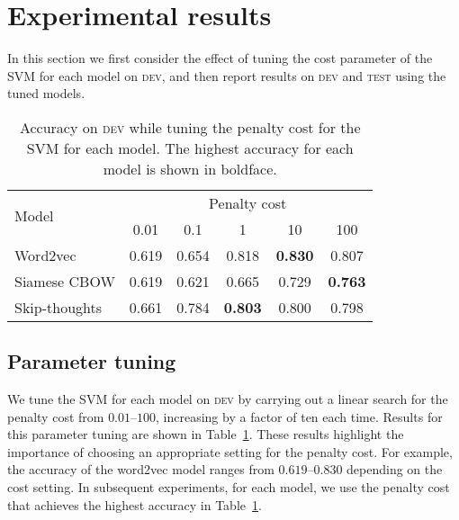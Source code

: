 \documentclass[11pt,a4paper]{article}
\newcommand{\tabref}[1]{Table~\ref{#1}}
\newcommand{\dev}{\textsc{dev}\xspace}
\newcommand{\test}{\textsc{test}\xspace}
\begin{document}
\section{Experimental results}

In this section we first consider the effect of tuning the cost
parameter of the SVM for each model on \dev, and then report results
on \dev and \test using the tuned models.


\begin{table}
\setlength{\tabcolsep}{0.17em}
\begin{center}
\begin{tabular}{l|ccccc}
\multirow{2}{*}{Model} & \multicolumn{5}{c}{Penalty cost}\\
\cline{2-6}
 &0.01 &0.1 &1 &10 &100\\
\hline
Word2vec     &0.619 &0.654 &0.818 &\textbf{0.830} &0.807\\
Siamese CBOW &0.619 &0.621 &0.665 &0.729 & \textbf{0.763}\\
Skip-thoughts &0.661& 0.784 &\textbf{0.803} &0.800 &0.798\\
\end{tabular}
\caption{Accuracy on \dev while tuning the penalty cost for the SVM
  for each model. The highest accuracy for each model is shown in
  boldface. \label{TuningAll}}
\end{center}
\end{table}







\subsection{Parameter tuning}


We tune the SVM for each model on \dev by carrying out a linear search
for the penalty cost from $0.01$--$100$, increasing by a factor of ten
each time. Results for this parameter tuning are shown in
\tabref{TuningAll}. These results highlight the importance of choosing
an appropriate setting for the penalty cost. For example, the accuracy
of the word2vec model ranges from $0.619$--$0.830$ depending on the
cost setting. In subsequent experiments, for each model, we use the
penalty cost that achieves the highest accuracy in \tabref{TuningAll}.
\end{document}
